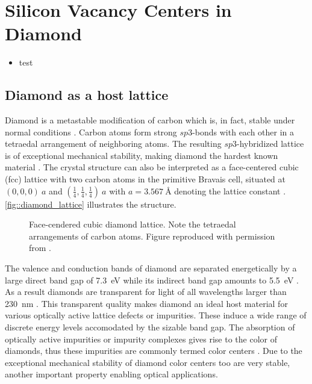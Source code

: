 
\chapter{Silicon Vacancy Centers in Diamond}	\label{ch::sivs}

\begin{remark}
    \begin{itemize}
      \item test
    \end{itemize}
\end{remark}

\section{Diamond as a host lattice}

  Diamond is a metastable modification of carbon which is, in fact, stable under normal conditions \cite{steinmetz::52}. Carbon atoms form strong $sp3$-bonds with each other in a tetraedal arrangement of neighboring atoms. The resulting $sp3$-hybridized lattice is of exceptional mechanical stability, making diamond the hardest known material \cite{?}. The crystal structure can also be interpreted as a face-centered cubic (fcc) lattice with two carbon atoms in the primitive Bravais cell, situated at $(0,0,0) \ a$ and $ (\frac{1}{4}, \frac{1}{4}, \frac{1}{4}) \ a$ with $a = \SI{3.567}{\angstrom}$ denoting the lattice constant \cite{steinmetz::56}. \autoref{fig::diamond_lattice} illustrates the structure.

  \begin{figure}[htp]
		\centering
		\caption{Face-cendered cubic diamond lattice. Note the tetraedal arrangements of carbon atoms. Figure reproduced with permission from \cite{janine::thesis}.}
		\label{fig::diamond_lattice}
	\end{figure}

  The valence and conduction bands of diamond are separated energetically by a large direct band gap of \SI{7.3}{\eV} while its indirect band gap amounts to \SI{5.5}{\eV} \cite{steinmetz::57, neu::91}. As a result diamonds are transparent for light of all wavelengths larger than \SI{230}{\nm} \cite{neu::87}. This transparent quality makes diamond an ideal host material for various optically active lattice defects or impurities. These induce a wide range of discrete energy levels accomodated by the sizable band gap. The absorption of optically active impurities or impurity complexes gives rise to the color of diamonds, thus these impurities are commonly termed color centers \cite{neu::thesis}. Due to the exceptional mechanical stability of diamond color centers too are very stable, another important property enabling optical applications.

